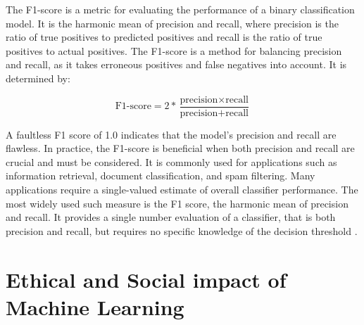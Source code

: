 \documentclass{article}[12pt]
\theoremstyle{definition}
\begin{document}
\bigskip

The F1-score is a metric for evaluating the performance of a binary classification model. It is the harmonic mean of precision and recall, where precision is the ratio of true positives to predicted positives and recall is the ratio of true positives to actual positives. The F1-score is a method for balancing precision and recall, as it takes erroneous positives and false negatives into account. It is determined by:

$$ \text{F1-score} = 2 * \frac{\text{precision} \times \text{recall}}{\text{precision} + \text{recall}} $$

\medskip

\noindent
A faultless F1 score of 1.0 indicates that the model's precision and recall are flawless. In practice, the F1-score is beneficial when both precision and recall are crucial and must be considered. It is commonly used for applications such as information retrieval, document classification, and spam filtering. Many applications require a single-valued estimate of overall classifier performance. The most widely used such measure is the F1 score, the harmonic mean of precision and recall. It provides a single number evaluation of a classifier, that is both precision and recall, but requires no specific knowledge of the decision threshold \cite{powers2011evaluation}. 


\newpage

\bigskip

\section{Ethical and Social impact of Machine Learning}

\bigskip
\end{document}

